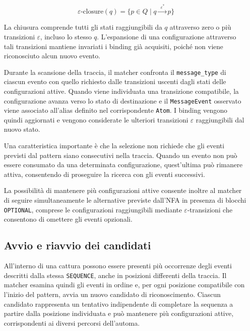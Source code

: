 \[
\varepsilon\text{-closure}(q) = \{ p \in Q \mid q \xrightarrow{ \ \ \varepsilon^{*} \ } p\}
\]

La chiusura comprende tutti gli stati raggiungibili da \(q\) attraverso zero o più transizioni \(\varepsilon\), incluso lo stesso \(q\). L'espansione di una configurazione attraverso tali transizioni mantiene invariati i binding già acquisiti, poiché non viene riconosciuto alcun nuovo evento.

Durante la scansione della traccia, il matcher confronta il \texttt{message\_type} di ciascun evento con quello richiesto dalle transizioni uscenti dagli stati delle configurazioni attive. Quando viene individuata una transizione compatibile, la configurazione avanza verso lo stato di destinazione e il \texttt{MessageEvent} osservato viene associato all'alias definito nel corrispondente \texttt{Atom}. I binding vengono quindi aggiornati e vengono considerate le ulteriori transizioni \(\varepsilon\) raggiungibili dal nuovo stato.

Una caratteristica importante è che la selezione non richiede che gli eventi previsti dal pattern siano consecutivi nella traccia. Quando un evento non può essere consumato da una determinata configurazione, quest'ultima può rimanere attiva, consentendo di proseguire la ricerca con gli eventi successivi.

La possibilità di mantenere più configurazioni attive consente inoltre al matcher di seguire simultaneamente le alternative previste dall'NFA in presenza di blocchi \texttt{OPTIONAL}, comprese le configurazioni raggiungibili mediante \(\varepsilon\)-transizioni che consentono di omettere gli eventi opzionali.

\subsection{Avvio e riavvio dei candidati}\label{politica-di-matching-e-produzione-dei-risultati}

All'interno di una cattura possono essere presenti più occorrenze degli eventi descritti dalla stessa \texttt{SEQUENCE}, anche in posizioni differenti della traccia. Il matcher esamina quindi gli eventi in ordine e, per ogni posizione compatibile con l'inizio del pattern, avvia un nuovo candidato di riconoscimento. Ciascun candidato rappresenta un tentativo indipendente di completare la sequenza a partire dalla posizione individuata e può mantenere più configurazioni attive, corrispondenti ai diversi percorsi dell'automa.

